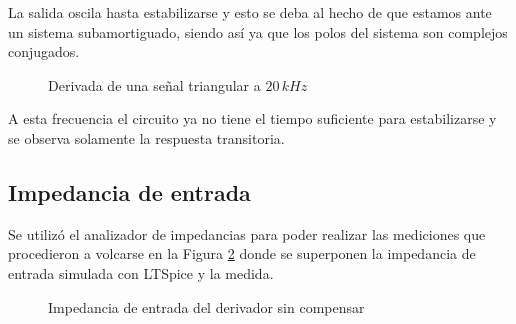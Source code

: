 \documentclass[11pt, a4paper]{article}
\begin{document}
La salida oscila hasta estabilizarse y esto se deba al hecho de que estamos ante un sistema subamortiguado, siendo así ya que los polos del sistema son complejos conjugados.

\begin{figure}[H]
	\begin{center}
		\caption{Derivada de una señal triangular a $20 \, kHz$}
		\label{fig:derivtriangNOcomp20kHz}
	\end{center}
\end{figure}

A esta frecuencia el circuito ya no tiene el tiempo suficiente para estabilizarse y se observa solamente la respuesta transitoria.

\subsection{Impedancia de entrada}
Se utilizó el analizador de impedancias para poder realizar las mediciones que procedieron a volcarse en la Figura \ref{fig:zinsuperDERivador} donde se superponen la impedancia de entrada simulada con LTSpice y la medida.


\begin{figure}[H]
	\begin{center}
		\caption{Impedancia de entrada del derivador sin compensar}
		\label{fig:zinsuperDERivador}
	\end{center}
\end{figure}
\end{document}
